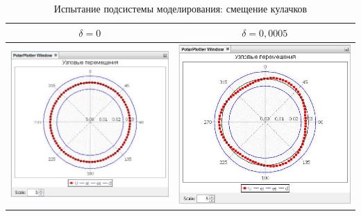 \documentclass[14pt,oneside,final]{extreport}
\begin{document}
	\begin{table}[h!]
		\centering
		\caption{Испытание подсистемы моделирования: смещение кулачков}
		\label{tab:displ-tests}{
			{\tabulinesep=1.2mm
				\begin{tabu}[]{|c|c|}
					\hline
					$ \delta = 0 $ & 	$ \delta = 0,0005 $ \\ \hline
					\includegraphics[scale=0.55]{img/simulation-displ-test-graph0} & \includegraphics[scale=0.55]{img/simulation-displ-test-graph3}  \\ 

\end{tabu}}}
\end{table}
\end{document}
